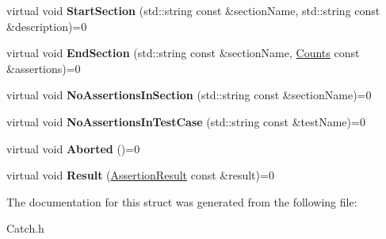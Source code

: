 \begin{DoxyCompactItemize}
\item 
\hypertarget{struct_catch_1_1_i_reporter_a8fc7f21b3d03083f1633431f47534404}{virtual void {\bfseries Start\-Section} (std\-::string const \&section\-Name, std\-::string const \&description)=0}\label{struct_catch_1_1_i_reporter_a8fc7f21b3d03083f1633431f47534404}

\item 
\hypertarget{struct_catch_1_1_i_reporter_a1bc1fd4b6cd5431a3a8c943c9c4d8d57}{virtual void {\bfseries End\-Section} (std\-::string const \&section\-Name, \hyperlink{struct_catch_1_1_counts}{Counts} const \&assertions)=0}\label{struct_catch_1_1_i_reporter_a1bc1fd4b6cd5431a3a8c943c9c4d8d57}

\item 
\hypertarget{struct_catch_1_1_i_reporter_ad382266a8a98628e5c199c6961734a9e}{virtual void {\bfseries No\-Assertions\-In\-Section} (std\-::string const \&section\-Name)=0}\label{struct_catch_1_1_i_reporter_ad382266a8a98628e5c199c6961734a9e}

\item 
\hypertarget{struct_catch_1_1_i_reporter_afe624f1c1c221703d1bdbf12d2cc058f}{virtual void {\bfseries No\-Assertions\-In\-Test\-Case} (std\-::string const \&test\-Name)=0}\label{struct_catch_1_1_i_reporter_afe624f1c1c221703d1bdbf12d2cc058f}

\item 
\hypertarget{struct_catch_1_1_i_reporter_a00d9d8bedcf32e5fdeed12b620b7ff7e}{virtual void {\bfseries Aborted} ()=0}\label{struct_catch_1_1_i_reporter_a00d9d8bedcf32e5fdeed12b620b7ff7e}

\item 
\hypertarget{struct_catch_1_1_i_reporter_aff9de693fee3a041d022894453140c5a}{virtual void {\bfseries Result} (\hyperlink{class_catch_1_1_assertion_result}{Assertion\-Result} const \&result)=0}\label{struct_catch_1_1_i_reporter_aff9de693fee3a041d022894453140c5a}

\end{DoxyCompactItemize}


The documentation for this struct was generated from the following file\-:\begin{DoxyCompactItemize}
\item 
Catch.\-h\end{DoxyCompactItemize}
